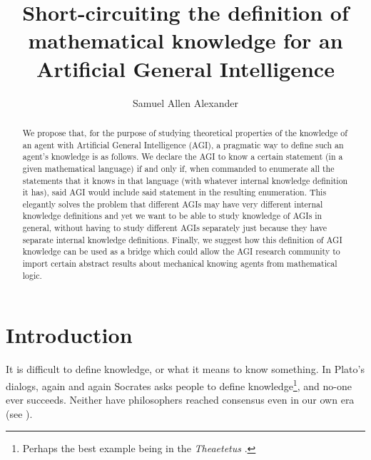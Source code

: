 \documentclass[runningheads]{llncs}
\begin{document}
\title{Short-circuiting the definition of mathematical knowledge for an
Artificial General Intelligence
}


\author{Samuel Allen
Alexander}



\maketitle

\begin{abstract}
We propose that, for the purpose of studying theoretical properties of
the knowledge of an agent with Artificial General Intelligence (AGI),
a pragmatic way to define such an agent's knowledge is as follows.
We declare the AGI to know a certain statement
(in a given mathematical language) if and only if, when commanded
to enumerate all the statements that it knows in that language
(with whatever internal knowledge definition it has), said AGI
would include said statement in the resulting enumeration.
This elegantly solves the problem that different AGIs may have
very different internal knowledge definitions and yet we want
to be able to study knowledge of AGIs in general, without having
to study different AGIs separately just because they have separate
internal knowledge definitions. Finally, we suggest how this
definition of AGI knowledge can be used as a bridge which could
allow the AGI research community to import certain abstract results
about mechanical knowing agents from mathematical logic.
\end{abstract}

\section{Introduction}

It is difficult to define knowledge, or what it means to know something.
In Plato's dialogs, again and again Socrates asks people to define
knowledge\footnote{Perhaps the best example being in the \emph{Theaetetus}
\cite{theaetetus}.}, and no-one ever succeeds. Neither have philosophers
reached consensus even in our own era (see \cite{sep-knowledge-analysis}).
\end{document}
